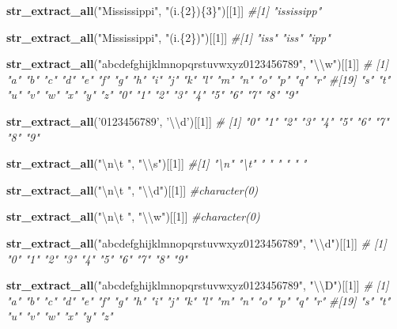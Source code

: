 \documentclass[]{book}
\newenvironment{Shaded}{\begin{snugshade}}{\end{snugshade}}
\newcommand{\KeywordTok}[1]{\textcolor[rgb]{0.13,0.29,0.53}{\textbf{#1}}}
\newcommand{\DecValTok}[1]{\textcolor[rgb]{0.00,0.00,0.81}{#1}}
\newcommand{\CharTok}[1]{\textcolor[rgb]{0.31,0.60,0.02}{#1}}
\newcommand{\StringTok}[1]{\textcolor[rgb]{0.31,0.60,0.02}{#1}}
\newcommand{\CommentTok}[1]{\textcolor[rgb]{0.56,0.35,0.01}{\textit{#1}}}
\newcommand{\NormalTok}[1]{#1}
\begin{document}
\begin{Shaded}
\begin{Highlighting}[]
\KeywordTok{str_extract_all}\NormalTok{(}\StringTok{"Mississippi"}\NormalTok{, }\StringTok{"(i.\{2\})\{3\}"}\NormalTok{)[[}\DecValTok{1}\NormalTok{]]}
\CommentTok{#[1] "ississipp"}

\KeywordTok{str_extract_all}\NormalTok{(}\StringTok{"Mississippi"}\NormalTok{, }\StringTok{"(i.\{2\})"}\NormalTok{)[[}\DecValTok{1}\NormalTok{]]}
\CommentTok{#[1] "iss" "iss" "ipp"}

\KeywordTok{str_extract_all}\NormalTok{(}\StringTok{"abcdefghijklmnopqrstuvwxyz0123456789"}\NormalTok{, }\StringTok{"}\CharTok{\textbackslash{}\textbackslash{}}\StringTok{w"}\NormalTok{)[[}\DecValTok{1}\NormalTok{]]}
\CommentTok{# [1] "a" "b" "c" "d" "e" "f" "g" "h" "i" "j" "k" "l" "m" "n" "o" "p" "q" "r"}
\CommentTok{#[19] "s" "t" "u" "v" "w" "x" "y" "z" "0" "1" "2" "3" "4" "5" "6" "7" "8" "9"}

\KeywordTok{str_extract_all}\NormalTok{(}\StringTok{'0123456789'}\NormalTok{, }\StringTok{'}\CharTok{\textbackslash{}\textbackslash{}}\StringTok{d'}\NormalTok{)[[}\DecValTok{1}\NormalTok{]]}
\CommentTok{# [1] "0" "1" "2" "3" "4" "5" "6" "7" "8" "9"}

\KeywordTok{str_extract_all}\NormalTok{(}\StringTok{"}\CharTok{\textbackslash{}n\textbackslash{}t}\StringTok{   "}\NormalTok{, }\StringTok{"}\CharTok{\textbackslash{}\textbackslash{}}\StringTok{s"}\NormalTok{)[[}\DecValTok{1}\NormalTok{]]}
\CommentTok{#[1] "\textbackslash{}n" "\textbackslash{}t" " "  " "  " "}

\KeywordTok{str_extract_all}\NormalTok{(}\StringTok{"}\CharTok{\textbackslash{}n\textbackslash{}t}\StringTok{   "}\NormalTok{, }\StringTok{"}\CharTok{\textbackslash{}\textbackslash{}}\StringTok{d"}\NormalTok{)[[}\DecValTok{1}\NormalTok{]]}
\CommentTok{#character(0)}

\KeywordTok{str_extract_all}\NormalTok{(}\StringTok{"}\CharTok{\textbackslash{}n\textbackslash{}t}\StringTok{   "}\NormalTok{, }\StringTok{"}\CharTok{\textbackslash{}\textbackslash{}}\StringTok{w"}\NormalTok{)[[}\DecValTok{1}\NormalTok{]]}
\CommentTok{#character(0)}

\KeywordTok{str_extract_all}\NormalTok{(}\StringTok{"abcdefghijklmnopqrstuvwxyz0123456789"}\NormalTok{, }\StringTok{"}\CharTok{\textbackslash{}\textbackslash{}}\StringTok{d"}\NormalTok{)[[}\DecValTok{1}\NormalTok{]]}
\CommentTok{# [1] "0" "1" "2" "3" "4" "5" "6" "7" "8" "9"}

\KeywordTok{str_extract_all}\NormalTok{(}\StringTok{"abcdefghijklmnopqrstuvwxyz0123456789"}\NormalTok{, }\StringTok{"}\CharTok{\textbackslash{}\textbackslash{}}\StringTok{D"}\NormalTok{)[[}\DecValTok{1}\NormalTok{]]}
\CommentTok{# [1] "a" "b" "c" "d" "e" "f" "g" "h" "i" "j" "k" "l" "m" "n" "o" "p" "q" "r"}
\CommentTok{#[19] "s" "t" "u" "v" "w" "x" "y" "z"}


\end{Highlighting}
\end{Shaded}
\end{document}
